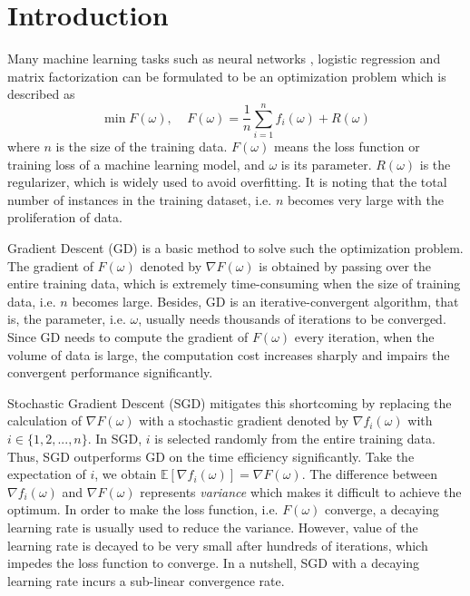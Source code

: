 \documentclass[conference]{IEEEtran}
\begin{document}
\section{Introduction}
Many machine learning tasks such as neural networks \citep{Dean2012Large}, logistic regression \citep{Roux2012A} and matrix factorization \citep{Sa2015Global} can be formulated to be an optimization problem which is described as 
\begin{equation}
\label{equation_loss_minimization}
\min F(\omega),~~~~~F(\omega)=\frac{1}{n}\sum\limits_{i=1}^n f_i(\omega)+R(\omega)
\end{equation}
where $n$ is the size of the training data. $F(\omega)$ means the loss function or training loss of a machine learning model, and $\omega$ is its parameter. $R(\omega)$ is the regularizer, which is widely used to avoid overfitting. It is noting that the total number of instances in the training dataset, i.e. $n$ becomes very large with the proliferation of data. 

Gradient Descent (GD) \citep{Boyd2013Convex} is a basic method to solve such the optimization problem. The gradient of $F(\omega)$ denoted by $\nabla F(\omega)$  is obtained by passing over the entire training data, which is extremely time-consuming when the size of training data, i.e. $n$ becomes large.  Besides, GD is an iterative-convergent algorithm, that is, the parameter, i.e. $\omega$, usually needs thousands of iterations to be converged.   Since GD needs to compute the  gradient of  $F(\omega)$ every iteration, when the volume of data is large, the computation cost increases sharply and impairs the convergent performance significantly. 

Stochastic Gradient Descent (SGD) \citep{Robbins1951A} mitigates this shortcoming by replacing the calculation of $\nabla F(\omega)$ with a stochastic gradient denoted by $\nabla f_i(\omega)$ with $i\in\{1,2, ..., n\}$. In SGD, $i$ is selected randomly  from the entire training data. Thus, SGD outperforms GD on the time efficiency significantly. Take the expectation of $i$, we obtain $\mathbb{E}[\nabla f_i(\omega)] = \nabla F(\omega)$. The difference between $\nabla f_i(\omega)$ and  $\nabla F(\omega)$ represents \emph{variance} which makes it difficult to achieve the optimum.  In order to make the loss function, i.e. $F(\omega)$ converge, a decaying learning rate is usually used to reduce the variance. However, value of the learning rate is decayed to be very small after hundreds of iterations, which impedes the loss function to converge. In a nutshell, SGD with a decaying learning rate incurs a sub-linear convergence rate.
\end{document}
